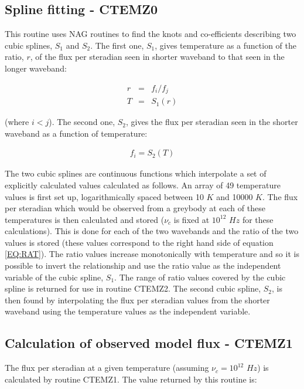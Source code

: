\subsection{Spline fitting - CTEMZ0}
This routine uses {\small NAG} routines to find the knots and co-efficients
describing two cubic splines, $S_{1}$ and $S_{2}$. The first one, $S_{1}$, gives
temperature as a function of the ratio, $r$, of the flux per steradian seen in
shorter waveband to that seen in the longer waveband:

\begin{eqnarray*}
r & = & f_{i}/f_{j}\\
T & = & S_{1}( r )
\end{eqnarray*}

(where $i<j$). The second one, $S_{2}$, gives the flux per steradian seen in the
shorter waveband as a function of temperature: 

\begin{eqnarray*}
f_{i} = S_{2}( T )
\end{eqnarray*}

The two cubic splines are continuous functions which interpolate a set of
explicitly calculated values calculated as follows. An array of 49 temperature
values is first set up, logarithmically spaced between 10 $K$ and 10000 $K$. The
flux per steradian which would be observed from a greybody at each of these
temperatures is then calculated and stored ($\nu_c$ is fixed at $10^{12}$ $Hz$ for
these calculations). This is done for each of the two wavebands and the ratio of
the two values is stored (these values correspond to the right hand side of
equation \ref{EQ:RAT}). The ratio values increase monotonically with temperature
and so it is possible to invert the relationship and use the ratio value as the
independent variable of the cubic spline, $S_{1}$. The range of ratio values
covered by the cubic spline is returned for use in routine {\small CTEMZ2}. The
second cubic spline, $S_{2}$, is then found by interpolating the flux per
steradian values from the shorter waveband using the temperature values as the
independent variable. 

\subsection{Calculation of observed model flux - CTEMZ1}
The flux per steradian at a given temperature (assuming $\nu_{c}=10^{12}$ $Hz$) 
is calculated by routine {\small CTEMZ1}. The value returned by this routine is:

